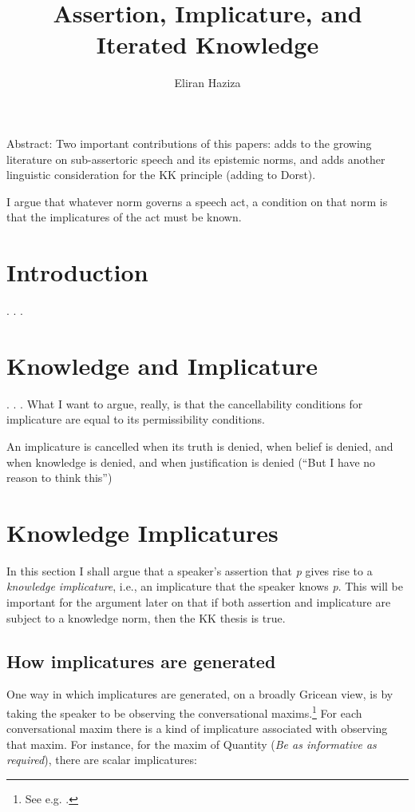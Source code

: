 \documentclass[12pt]{article}
\title{Assertion, Implicature, and Iterated Knowledge}
\author{Eliran Haziza}
\begin{document}
\maketitle

Abstract:
Two important contributions of this papers: adds to the growing literature on sub-assertoric speech and its epistemic norms, and adds another linguistic consideration for the KK principle (adding to Dorst).

I argue that whatever norm governs a speech act, a condition on that norm is that the implicatures of the act must be known.

\section{Introduction}

. . .

\section{Knowledge and Implicature}

. . .
What I want to argue, really, is that the cancellability conditions for implicature are equal to its permissibility conditions.

An implicature is cancelled when its truth is denied, when belief is denied, and when knowledge is denied, and when justification is denied (``But I have no reason to think this'')

\section{Knowledge Implicatures}

In this section I shall argue that a speaker's assertion that \textit{p} gives rise to a \textit{knowledge implicature}, i.e., an implicature that the speaker knows \textit{p}. This will be important for the argument later on that if both assertion and implicature are subject to a knowledge norm, then the KK thesis is true.

\subsection{How implicatures are generated}

One way in which implicatures are generated, on a broadly Gricean view, is by taking the speaker to be observing the conversational maxims.\footnote{See e.g. \textcites[p.~44f]{birner_introduction_2013}[33]{huang_pragmatics_2015}[158]{huang_implicature_2017}[103-4]{levinson_pragmatics_1983}.} For each conversational maxim there is a kind of implicature associated with observing that maxim. For instance, for the maxim of Quantity (\textit{Be as informative as required}), there are scalar implicatures:
\end{document}
